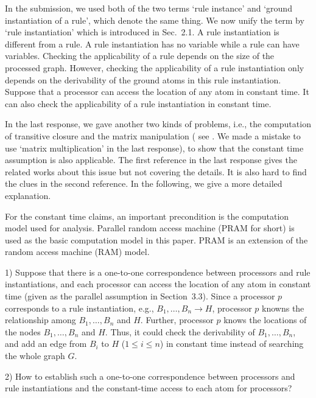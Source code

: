 \documentclass{article}
\begin{document}
In the submission, we used both of the two terms `rule instance'
and `ground instantiation of a rule', which denote the same thing.
We now unify the term by `rule instantiation' which is introduced
in Sec.~2.1. A rule instantiation is different from a rule.
A rule instantiation has no variable while a rule can have variables.
Checking the applicability of a rule depends on the size of the
processed graph. However, checking the applicability of a rule
instantiation only depends on the derivability of the ground atoms
in this rule instantiation. Suppose that a processor can access the
location of any atom in constant time. It can also check the applicability of
a rule instantiation in constant time.

In the last response, we gave another two kinds of problems, i.e.,
the computation of transitive closure and the matrix manipulation (
see \cite[Part~\uppercase\expandafter{}~A]{Raymond95}. 
We made a mistake to use `matrix multiplication'
in the last response), to show that the constant time assumption
is also applicable. The first reference in the last response gives the related works
about this issue but not covering the details. It is also hard to find
the clues in the second reference.
In the following, we give a more detailed explanation.

For the constant time claims, an important precondition is the
computation model used for analysis. Parallel random access machine
(PRAM for short) is used as the basic computation model in this
paper. PRAM is an extension of the random access machine (RAM) model.

1) Suppose that there is a one-to-one correspondence between
processors and rule instantiations, and each processor can access the
location of any atom in constant time (given as the parallel
assumption in Section~3.3). Since a processor $p$ corresponds
to a rule instantiation, e.g., $B_1, \ldots, B_n \to H$, processor $p$
knowns the relationship among $B_1, \ldots, B_n$ and $H$. Further,
processor $p$ knows the locations of the nodes $B_1, \ldots, B_n$ and
$H$. Thus, it could check the derivability of $B_1, \ldots, B_n$, and
add an edge from $B_i$ to $H$ ($1 \leq i \leq n$) in
constant time instead of searching the whole graph $G$.

2) How to establish such a one-to-one correspondence between processors
and rule instantiations and the constant-time access to each atom for processors?
\end{document}

